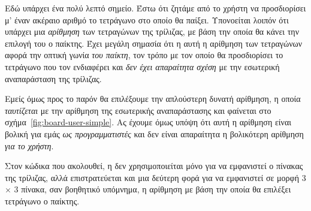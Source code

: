 \documentclass[a4paper,11pt,oneside]{book}
\begin{document}

Εδώ υπάρχει ένα πολύ λεπτό σημείο. Έστω ότι ζητάμε από το χρήστη να προσδιορίσει μ' έναν ακέραιο αριθμό το τετράγωνο στο οποίο θα παίξει. Υπονοείται λοιπόν ότι υπάρχει μια \emph{αρίθμηση} των τετραγώνων της τρίλιζας, με βάση την οποία θα κάνει την επιλογή του ο παίκτης. Έχει μεγάλη σημασία ότι η αυτή η αρίθμηση των τετραγώνων αφορά την οπτική γωνία \emph{του παίκτη}, τον τρόπο με τον οποίο θα προσδιορίσει το τετράγωνο που τον ενδιαφέρει και \emph{δεν έχει απαραίτητα σχέση} με την εσωτερική αναπαράσταση της τρίλιζας. 

Εμείς όμως προς το παρόν θα επιλέξουμε την απλούστερη δυνατή αρίθμηση, η οποία \emph{ταυτίζεται} με την αρίθμηση της εσωτερικής αναπαράστασης και φαίνεται στο σχήμα~\ref{fig:board-user-simple}. Ας έχουμε όμως υπόψη ότι αυτή η αρίθμηση είναι βολική για εμάς \emph{ως προγραμματιστές} και δεν είναι απαραίτητα η βολικότερη αρίθμηση \emph{για το χρήστη}.

Στον κώδικα που ακολουθεί, η  δεν χρησιμοποιείται μόνο για να εμφανιστεί ο πίνακας της τρίλιζας, αλλά επιστρατεύεται και μια δεύτερη φορά για να εμφανιστεί σε μορφή 3 $\times$ 3 πίνακα, σαν βοηθητικό υπόμνημα, η αρίθμηση με βάση την οποία θα επιλέξει τετράγωνο ο παίκτης.

\end{document}
